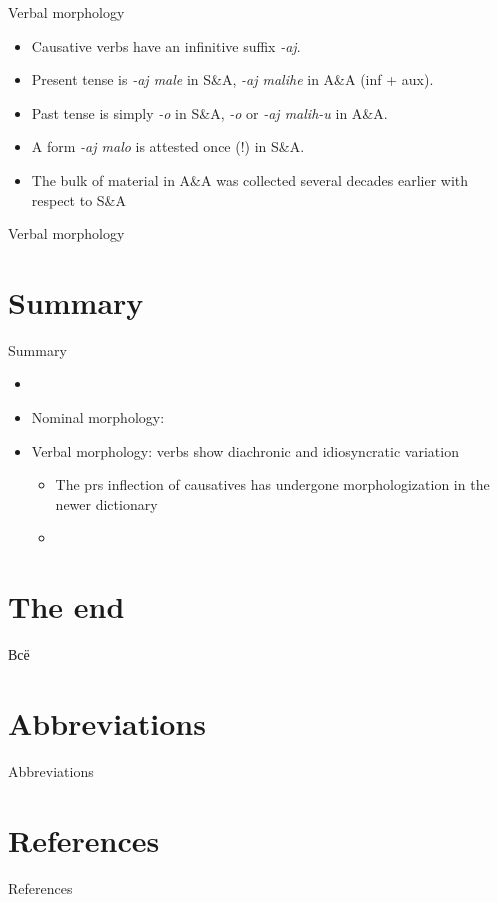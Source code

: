 \begin{frame}{Verbal morphology}
\begin{itemize}
    \item Causative verbs have an infinitive suffix \textit{-aj}.
    \item Present tense is \textit{-aj male} in S\&A, \textit{-aj malihe} in A\&A (inf + aux).
    \item Past tense is simply \textit{-o} in S\&A, \textit{-o} or \textit{-aj malih-u} in A\&A.
    \item A form \textit{-aj malo} is attested once (!) in S\&A.
    \pause
    \item The bulk of material in A\&A was collected several decades earlier with respect to S\&A
\end{itemize}
\end{frame}


\begin{frame}{Verbal morphology}


\end{frame}



\section{Summary}
\begin{frame}{Summary}
\begin{itemize}
    \item %
    \pause
    \item Nominal morphology: 
    \pause
    \item Verbal morphology: verbs show diachronic and idiosyncratic variation
    \begin{itemize}
        \item The prs inflection of causatives has undergone morphologization in the newer dictionary
        \item 
    \end{itemize}
\end{itemize}
\end{frame}

\section{The end}
\begin{frame}{Всё}
\end{frame}

\section{Abbreviations}
\begin{frame}{Abbreviations}

\tiny{\printglossary}

\end{frame}

\section{References}
\begin{frame}{References}

\printbibliography

\end{frame}

